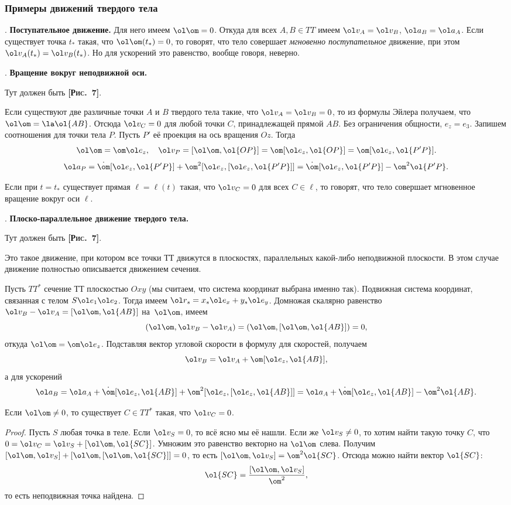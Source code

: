\documentclass[a4paper,12pt]{article}
\def\w{\ol\om}
\def\a{\ol a}
\def\r{\ol r}
\def\v{\ol v}
\def\e{\ol e}
\def\d{\dot}
\def\pic#1{ \hbox{\textbf{\textsc{[Рис.~#1]}}}}
\begin{document}
\subsubsection{Примеры движений твердого тела}

. \textbf{Поступательное движение.} Для него имеем $\w=0$.
Откуда для всех $A,B\in TT$ имеем $\v_A=\v_B$, $\a_B=\a_A$. Если
существует точка $t_*$ такая, что $\w(t_*)=0$, то говорят, что
тело совершает \emph{мгновенно поступательное} движение, при этом
$\v_A(t_*)=\v_B(t_*)$. Но для ускорений это равенство, вообще
говоря, неверно.

\medskip

. \textbf{Вращение вокруг неподвижной оси.}

Тут должен быть \pic{7}.

Если существуют две различные
точки $A$ и $B$ твердого тела такие, что $\v_A=\v_B=0$, то
из формулы Эйлера получаем, что $\w=\la \ol{AB}$. Отсюда $\v_C=0$ для любой точки $C$,
принадлежащей прямой $AB$. Без ограничения общности, $e_z = e_3$.
Запишем соотношения для точки тела $P$. Пусть $P'$ её проекция
на ось вращения $Oz$. Тогда
$$\w=\om\e_z,\quad \v_P=[\w,\ol{OP}]=\om[\e_z,\ol{OP}]=\om[\e_z,\ol{P'P}].$$
$$\a_P=\d\om[\e_z,\ol {P'P}]+\om^2[\e_z,[\e_z, \ol{P'P}]]=\d\om[\e_z,\ol{P'P}]-\om^2\ol{P'P}.$$

 Если при $t=t_*$ существует прямая $\ell=\ell(t)$ такая, что
$\v_C=0$ для всех $C\in \ell$, то говорят, что тело совершает
мгновенное вращение вокруг оси $\ell$.

\medskip

. \textbf{Плоско-параллельное движение твердого тела.}

Тут должен быть \pic{7}.

Это такое движение, при котором все точки ТТ движутся в плоскостях,
параллельных какой-либо неподвижной плоскости. В этом случае движение
полностью описывается движением сечения.

Пусть $TT^*$ сечение ТТ плоскостью $Oxy$ (мы считаем, что система координат
выбрана именно так). Подвижная система координат, связанная с телом $S\e_1\e_2$.
Тогда имеем $\r_s=x_s\e_x+y_s\e_y$.
Домножая скалярно равенство $\v_B-\v_A=[\w,\ol{AB}]$ на~$\w$,
имеем
$$(\w,\v_B-\v_A)=(\w,[\w,\ol{AB}])=0,$$
откуда $\w=\om\e_z$. Подставляя вектор угловой скорости в формулу для скоростей, получаем
$$\v_B=\v_A+\om[\e_z,\ol{AB}],$$
а для ускорений
$$\a_B=\a_A+\d\om[\e_z,\ol{AB}]+\om^2[\e_z,[\e_z,\ol{AB}]]=\a_A+\d\om[\e_z,\ol{AB}]-\om^2\ol{AB}.$$

\begin{stm}
Если $\w\ne0$, то существует $C\in TT^*$ такая, что $\v_C=0$.
\end{stm}
\begin{proof}
Пусть $S$ любая точка в теле. Если $\v_S = 0$, то всё ясно мы её нашли.
Если же $\v_S \ne 0$, то хотим найти такую точку $C$, что
$0=\v_C=\v_S+[\w,\ol{SC}]$. Умножим это равенство векторно на $\w$ слева.
Получим $[\w,\v_S]+[\w,[\w,\ol{SC}]]=0$, то есть $[\w,\v_S]=\om^2\ol{SC}$.
Отсюда можно найти вектор $\ol{SC}$:
$$\ol{SC}=\frac{[\w,\v_S]}{\om^2},$$
то есть неподвижная точка найдена.
\end{proof}
\end{document}
